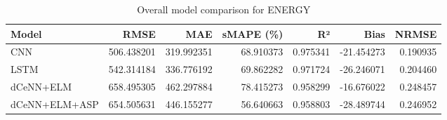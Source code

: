 \begin{table}
\caption{Overall model comparison for ENERGY}
\begin{tabular}{lrrrrrr}
\toprule
Model & RMSE & MAE & sMAPE (\%) & R² & Bias & NRMSE \\
\midrule
CNN & 506.438201 & 319.992351 & 68.910373 & 0.975341 & -21.454273 & 0.190935 \\
LSTM & 542.314184 & 336.776192 & 69.862282 & 0.971724 & -26.246071 & 0.204460 \\
dCeNN+ELM & 658.495305 & 462.297884 & 78.415273 & 0.958299 & -16.676022 & 0.248457 \\
dCeNN+ELM+ASP & 654.505631 & 446.155277 & 56.640663 & 0.958803 & -28.489744 & 0.246952 \\
\bottomrule
\end{tabular}
\end{table}

